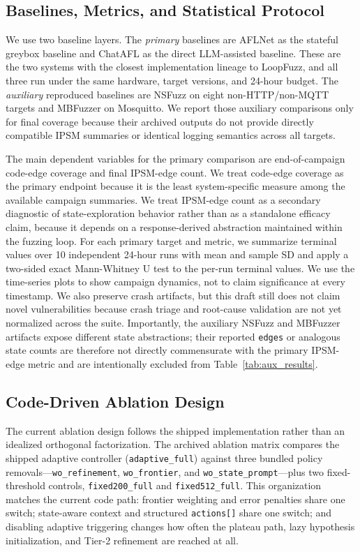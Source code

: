 \documentclass[conference]{IEEEtran}
\begin{document}
\subsection{Baselines, Metrics, and Statistical Protocol}
We use two baseline layers. The \emph{primary} baselines are AFLNet as the stateful greybox baseline and ChatAFL as the direct LLM-assisted baseline. These are the two systems with the closest implementation lineage to LoopFuzz, and all three run under the same hardware, target versions, and 24-hour budget. The \emph{auxiliary} reproduced baselines are NSFuzz on eight non-HTTP/non-MQTT targets and MBFuzzer on Mosquitto. We report those auxiliary comparisons only for final coverage because their archived outputs do not provide directly compatible IPSM summaries or identical logging semantics across all targets.

The main dependent variables for the primary comparison are end-of-campaign code-edge coverage and final IPSM-edge count. We treat code-edge coverage as the primary endpoint because it is the least system-specific measure among the available campaign summaries. We treat IPSM-edge count as a secondary diagnostic of state-exploration behavior rather than as a standalone efficacy claim, because it depends on a response-derived abstraction maintained within the fuzzing loop. For each primary target and metric, we summarize terminal values over 10 independent 24-hour runs with mean and sample SD and apply a two-sided exact Mann-Whitney U test to the per-run terminal values. We use the time-series plots to show campaign dynamics, not to claim significance at every timestamp. We also preserve crash artifacts, but this draft still does not claim novel vulnerabilities because crash triage and root-cause validation are not yet normalized across the suite. Importantly, the auxiliary NSFuzz and MBFuzzer artifacts expose different state abstractions; their reported \texttt{edges} or analogous state counts are therefore not directly commensurate with the primary IPSM-edge metric and are intentionally excluded from Table~\ref{tab:aux_results}.

\subsection{Code-Driven Ablation Design}
The current ablation design follows the shipped implementation rather than an idealized orthogonal factorization. The archived ablation matrix compares the shipped adaptive controller (\texttt{adaptive\_full}) against three bundled policy removals---\texttt{wo\_refinement}, \texttt{wo\_frontier}, and \texttt{wo\_state\_prompt}---plus two fixed-threshold controls, \texttt{fixed200\_full} and \texttt{fixed512\_full}. This organization matches the current code path: frontier weighting and error penalties share one switch; state-aware context and structured \texttt{actions[]} share one switch; and disabling adaptive triggering changes how often the plateau path, lazy hypothesis initialization, and Tier-2 refinement are reached at all.
\end{document}
